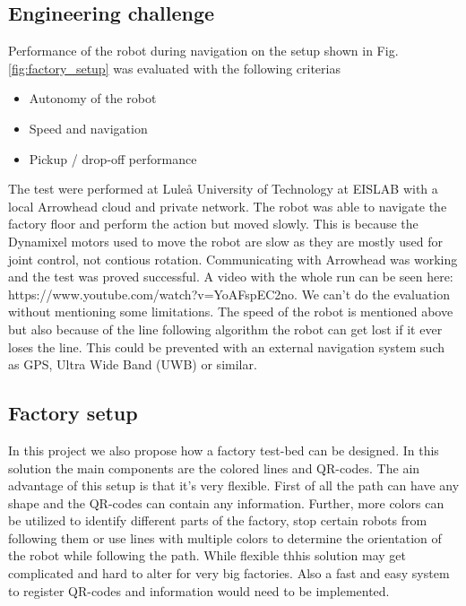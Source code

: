 \subsection{Engineering challenge}
Performance of the robot during navigation on the setup shown in Fig. \ref{fig:factory_setup} was evaluated with the following criterias

\begin{itemize}
    \item Autonomy of the robot
    \item Speed and navigation
    \item Pickup / drop-off performance
\end{itemize}

The test were performed at Luleå University of Technology at EISLAB with a local Arrowhead cloud and private network. The robot was able to navigate the factory floor and perform the action but moved slowly. This is because the Dynamixel motors used to move the robot are slow as they are mostly used for joint control, not contious rotation. Communicating with Arrowhead was working and the test was proved successful. A video with the whole run can be seen here: https://www.youtube.com/watch?v=YoAFspEC2no. 
We can't do the evaluation without mentioning some limitations. The speed of the robot is mentioned above but also because of the line following algorithm the robot can get lost if it ever loses the line. This could be prevented with an external navigation system such as GPS, Ultra Wide Band (UWB) or similar. 

\subsection{Factory setup}
In this project we also propose how a factory test-bed can be designed. In this solution the main components are the colored lines and QR-codes. The ain advantage of this setup is that it's very flexible. First of all the path can have any shape and the QR-codes can contain any information. Further, more colors can be utilized to identify different parts of the factory, stop certain robots from following them or use lines with multiple colors to determine the orientation of the robot while following the path. While flexible thhis solution may get complicated and hard to alter for very big factories. Also a fast and easy system to register QR-codes and information would need to be implemented. 
